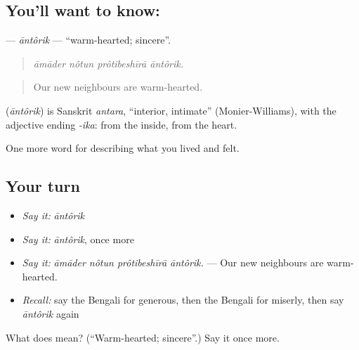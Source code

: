 \subsection*{You'll want to know: }
\textbf{} — \emph{āntôrik} — \textquotedblleft{}warm-hearted; sincere\textquotedblright{}.

\begin{quote}
   
\end{quote}

\begin{quote}
\emph{āmāder nôtun prôtibeshīrā āntôrik.}
\end{quote}

\begin{quote}
Our new neighbours are warm-hearted.
\end{quote}

\begin{cousinweb}
\textbf{} (\emph{āntôrik}) is Sanskrit \emph{antara}, \textquotedblleft{}interior, intimate\textquotedblright{} (Monier-Williams), with the adjective ending \emph{-ika}: from the inside, from the heart.
\end{cousinweb}

\begin{grammarlens}[title={What you've built}]
One more word for describing what you lived and felt.
\end{grammarlens}

\subsection*{Your turn}
\begin{itemize}
\raggedright
  \item \emph{Say it:} \emph{āntôrik}
  \item \emph{Say it:} \emph{āntôrik}, once more
  \item \emph{Say it:} \emph{āmāder nôtun prôtibeshīrā āntôrik.} — Our new neighbours are warm-hearted.
  \item \emph{Recall:} say the Bengali for generous, then the Bengali for miserly, then say \emph{āntôrik} again
\end{itemize}

\begin{tcolorbox}[breakable,colback=teal!4,colframe=teal!35!black,title={Before you move on}]
What does  mean? (\textquotedblleft{}Warm-hearted; sincere\textquotedblright{}.) Say it once more.
\end{tcolorbox}
